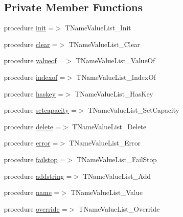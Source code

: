 \subsection*{Private Member Functions}
\begin{DoxyCompactItemize}
\item 
procedure \mbox{\hyperlink{structiniobjects_1_1tnamevaluelist_a1302a8051fb609c5b3cd0b6811c2296c}{init}} =$>$ T\+Name\+Value\+List\+\_\+\+Init
\item 
procedure \mbox{\hyperlink{structiniobjects_1_1tnamevaluelist_a5585539c6a900c1592c90cd98d068ffe}{clear}} =$>$ T\+Name\+Value\+List\+\_\+\+Clear
\item 
procedure \mbox{\hyperlink{structiniobjects_1_1tnamevaluelist_a47c542c4cd1f604b0e065ace2db14b1d}{valueof}} =$>$ T\+Name\+Value\+List\+\_\+\+Value\+Of
\item 
procedure \mbox{\hyperlink{structiniobjects_1_1tnamevaluelist_acef80497c31f2d4f0e7eb2d87dc96091}{indexof}} =$>$ T\+Name\+Value\+List\+\_\+\+Index\+Of
\item 
procedure \mbox{\hyperlink{structiniobjects_1_1tnamevaluelist_af1c80ad30e2e48d3512ee471149733ea}{haskey}} =$>$ T\+Name\+Value\+List\+\_\+\+Has\+Key
\item 
procedure \mbox{\hyperlink{structiniobjects_1_1tnamevaluelist_a4cd905abe8d1b298fc9dd69483c03eb1}{setcapacity}} =$>$ T\+Name\+Value\+List\+\_\+\+Set\+Capacity
\item 
procedure \mbox{\hyperlink{structiniobjects_1_1tnamevaluelist_ab83a882dd4a711bbb26544f85ec8b5e3}{delete}} =$>$ T\+Name\+Value\+List\+\_\+\+Delete
\item 
procedure \mbox{\hyperlink{structiniobjects_1_1tnamevaluelist_a4a70c8dcb57af53348281d7c0fb9e9be}{error}} =$>$ T\+Name\+Value\+List\+\_\+\+Error
\item 
procedure \mbox{\hyperlink{structiniobjects_1_1tnamevaluelist_a13806bc0310b12a737ea04bee4b6ec3a}{failstop}} =$>$ T\+Name\+Value\+List\+\_\+\+Fail\+Stop
\item 
procedure \mbox{\hyperlink{structiniobjects_1_1tnamevaluelist_a74bdab2d445f52984b729c59527bcab7}{addstring}} =$>$ T\+Name\+Value\+List\+\_\+\+Add
\item 
procedure \mbox{\hyperlink{structiniobjects_1_1tnamevaluelist_a19f25b17436bc9f933e247ba16237311}{name}} =$>$ T\+Name\+Value\+List\+\_\+\+Value
\item 
procedure \mbox{\hyperlink{structiniobjects_1_1tnamevaluelist_a2bb3b8e8f925165decafea3cb3c164e9}{override}} =$>$ T\+Name\+Value\+List\+\_\+\+Override

\end{DoxyCompactItemize}
